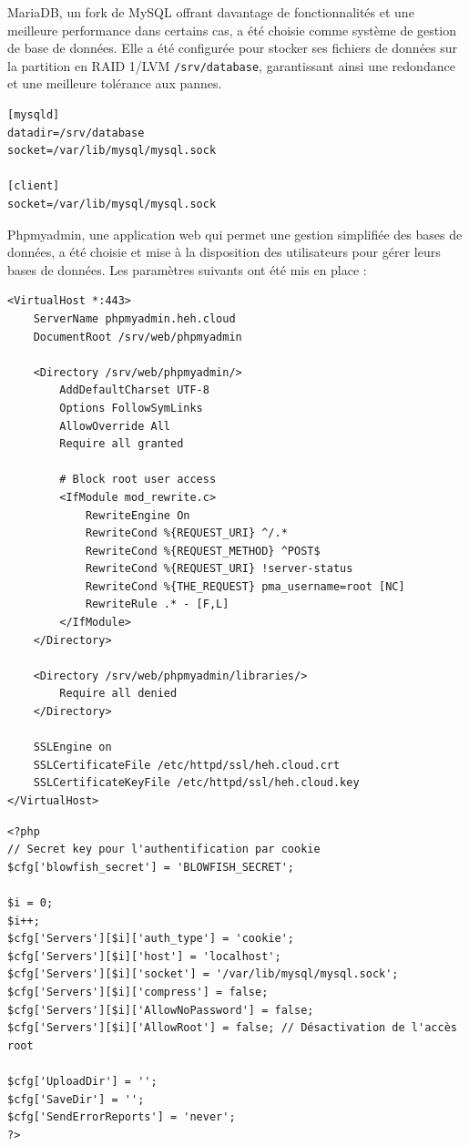 \documentclass[a4paper,12pt]{article}
\begin{document}
MariaDB, un fork de MySQL offrant davantage de fonctionnalités et une meilleure performance dans certains cas, a été choisie comme système de gestion de base de données. Elle a été configurée pour stocker ses fichiers de données sur la partition en RAID 1/LVM \texttt{/srv/database}, garantissant ainsi une redondance et une meilleure tolérance aux pannes.

\begin{lstlisting}[caption={Configuration MariaDB – /etc/my.cnf.d/server.cnf}]
[mysqld]
datadir=/srv/database
socket=/var/lib/mysql/mysql.sock

[client]
socket=/var/lib/mysql/mysql.sock
\end{lstlisting}

Phpmyadmin, une application web qui permet une gestion simplifiée des bases de données, a été choisie et mise à la disposition des utilisateurs pour gérer leurs bases de données. Les paramètres suivants ont été mis en place :

\begin{lstlisting}[caption={Configuration phpMyAdmin – /etc/httpd/conf.d/phpmyadmin.conf}]
<VirtualHost *:443>
    ServerName phpmyadmin.heh.cloud
    DocumentRoot /srv/web/phpmyadmin

    <Directory /srv/web/phpmyadmin/>
        AddDefaultCharset UTF-8
        Options FollowSymLinks
        AllowOverride All
        Require all granted

        # Block root user access
        <IfModule mod_rewrite.c>
            RewriteEngine On
            RewriteCond %{REQUEST_URI} ^/.*
            RewriteCond %{REQUEST_METHOD} ^POST$
            RewriteCond %{REQUEST_URI} !server-status
            RewriteCond %{THE_REQUEST} pma_username=root [NC]
            RewriteRule .* - [F,L]
        </IfModule>
    </Directory>

    <Directory /srv/web/phpmyadmin/libraries/>
        Require all denied
    </Directory>

    SSLEngine on
    SSLCertificateFile /etc/httpd/ssl/heh.cloud.crt
    SSLCertificateKeyFile /etc/httpd/ssl/heh.cloud.key
</VirtualHost>
\end{lstlisting}

\begin{lstlisting}[caption={Configuration phpMyAdmin – /srv/web/phpmyadmin/config.inc.php}]
<?php
// Secret key pour l'authentification par cookie
$cfg['blowfish_secret'] = 'BLOWFISH_SECRET';

$i = 0;
$i++;
$cfg['Servers'][$i]['auth_type'] = 'cookie';
$cfg['Servers'][$i]['host'] = 'localhost';
$cfg['Servers'][$i]['socket'] = '/var/lib/mysql/mysql.sock';
$cfg['Servers'][$i]['compress'] = false;
$cfg['Servers'][$i]['AllowNoPassword'] = false;
$cfg['Servers'][$i]['AllowRoot'] = false; // Désactivation de l'accès root

$cfg['UploadDir'] = '';
$cfg['SaveDir'] = '';
$cfg['SendErrorReports'] = 'never';
?>
\end{lstlisting}
\end{document}
